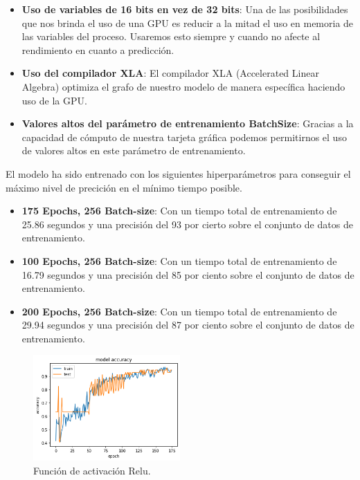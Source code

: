 \begin{itemize}
    \item \textbf{Uso de variables de 16 bits en vez de 32 bits}: Una de las posibilidades que nos brinda el uso de una GPU es reducir a la mitad el uso en memoria de las variables del proceso.
    Usaremos esto siempre y cuando no afecte al rendimiento en cuanto a predicción.
    \item \textbf{Uso del compilador XLA}: El compilador XLA (Accelerated Linear Algebra) optimiza el grafo de nuestro modelo de manera específica haciendo uso de la GPU.
    \item \textbf{Valores altos del parámetro de entrenamiento BatchSize}: Gracias a la capacidad de cómputo de nuestra tarjeta gráfica podemos permitirnos el uso de valores altos en este parámetro de entrenamiento.
\end{itemize}

El modelo ha sido entrenado con los siguientes hiperparámetros para conseguir el máximo nivel de precición en el mínimo tiempo posible.
\begin{itemize}
    \item \textbf{175 Epochs, 256 Batch-size}: Con un tiempo total de entrenamiento de 25.86 segundos y una precisión del 93 por cierto sobre el conjunto de datos de entrenamiento.
    \item \textbf{100 Epochs, 256 Batch-size}: Con un tiempo total de entrenamiento de 16.79 segundos y una precisión del 85 por ciento sobre el conjunto de datos de entrenamiento.
    \item \textbf{200 Epochs, 256 Batch-size}: Con un tiempo total de entrenamiento de 29.94 segundos y una precisión del 87 por ciento sobre el conjunto de datos de entrenamiento.
\end{itemize}
\iffalse
\begin{figure}
    \centering
    \includegraphics[width=0.5\textwidth]{images/chapter2/batch_256_175_epoch.png}
    \caption{Función de activación Relu.}
    \label{fig:Resultados de la precisión de entrenamiento con un batch-size de 256 y 175 epochs}
\end{figure}

